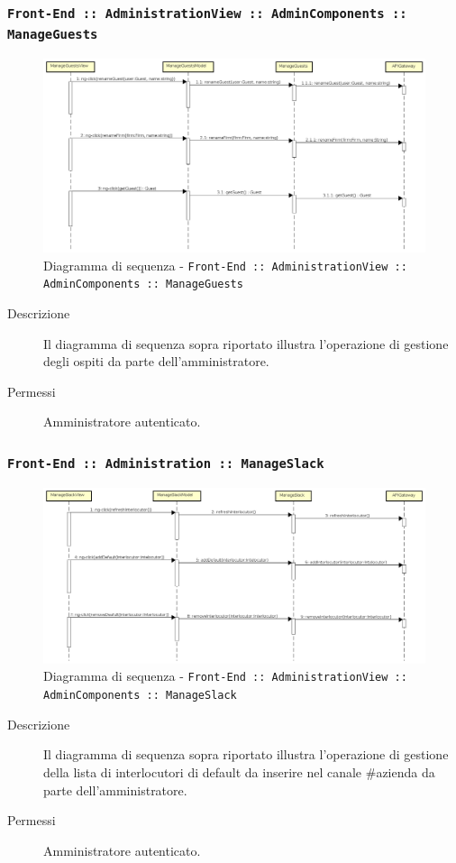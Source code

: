\documentclass[../DefinizioneDiProdotto.tex]{subfiles}
\begin{document}
		\subsubsection{\texttt{Front-End :: AdministrationView :: AdminComponents :: ManageGuests}}
		\begin{figure}[!h]
			\centering
			\includegraphics[width=\textwidth]{DiagrammiSequenza/Front-End/AdministrationView/ManageGuests.png}
			\caption{Diagramma di sequenza - \texttt{Front-End :: AdministrationView :: AdminComponents :: ManageGuests }}
		\end{figure}
		\begin{description}
			\item [Descrizione] Il diagramma di sequenza sopra riportato illustra l'operazione di gestione degli ospiti da parte dell'amministratore.
			\item [Permessi] Amministratore autenticato.
		\end{description}

		\subsubsection{\texttt{Front-End :: Administration :: ManageSlack}}
		\begin{figure}[!h]
			\centering
			\includegraphics[width=\textwidth]{DiagrammiSequenza/Front-End/AdministrationView/ManageSlack.png}
			\caption{Diagramma di sequenza - \texttt{Front-End :: AdministrationView :: AdminComponents :: ManageSlack }}
		\end{figure}
		\begin{description}
			\item [Descrizione] Il diagramma di sequenza sopra riportato illustra l'operazione di gestione della lista di interlocutori di default da inserire nel canale \#azienda da parte dell'amministratore.
			\item [Permessi] Amministratore autenticato.
		\end{description}
\end{document}
